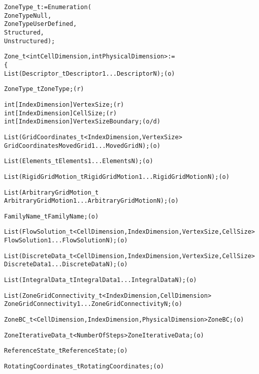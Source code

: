 \begin{alltt}	
  ZoneType\_t := Enumeration(
    ZoneTypeNull,
    ZoneTypeUserDefined,
    Structured,
    Unstructured ) ;

  Zone_t< int CellDimension, int PhysicalDimension > :=
    \{
    List( Descriptor_t Descriptor1 ... DescriptorN ) ;                      (o)

    ZoneType_t ZoneType ;                                                   (r)

    int[IndexDimension] VertexSize ;                                        (r)
    int[IndexDimension] CellSize ;                                          (r)
    int[IndexDimension] VertexSizeBoundary ;                                (o/d)

    List( GridCoordinates_t<IndexDimension, VertexSize>
          GridCoordinates MovedGrid1 ... MovedGridN ) ;                     (o)

    List( Elements_t Elements1 ... ElementsN ) ;                            (o)

    List( RigidGridMotion_t RigidGridMotion1 ... RigidGridMotionN ) ;       (o)

    List( ArbitraryGridMotion_t
          ArbitraryGridMotion1 ... ArbitraryGridMotionN ) ;                 (o)

    FamilyName_t FamilyName ;                                               (o)

    List( FlowSolution_t<CellDimension, IndexDimension, VertexSize, CellSize> 
          FlowSolution1 ... FlowSolutionN ) ;                               (o)

    List( DiscreteData_t<CellDimension, IndexDimension, VertexSize, CellSize> 
          DiscreteData1 ... DiscreteDataN ) ;                               (o)

    List( IntegralData_t IntegralData1 ... IntegralDataN ) ;                (o)

    List( ZoneGridConnectivity_t<IndexDimension, CellDimension>
       ZoneGridConnectivity1 ... ZoneGridConnectivityN ;                    (o)

    ZoneBC_t<CellDimension, IndexDimension, PhysicalDimension> ZoneBC ;     (o)

    ZoneIterativeData_t<NumberOfSteps> ZoneIterativeData ;                  (o)

    ReferenceState_t ReferenceState ;                                       (o)

    RotatingCoordinates\_t RotatingCoordinates ;                             (o)


\end{alltt}
